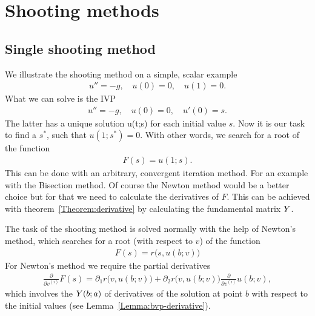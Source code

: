 \section{Shooting methods}
\subsection{Single shooting method}

\begin{example}
  We illustrate the shooting method on a simple, scalar example
  \begin{gather*}
    u'' = -g, \quad u(0) = 0, \quad u(1) = 0.
  \end{gather*}
	What we can solve is the IVP
  \begin{gather*}
    u'' = -g, \quad u(0) = 0, \quad u'(0) = s.
  \end{gather*}
	The latter has a unique solution u(t;s) for each initial value
  $s$. Now it is our task to find a $s^*$, such that
  $u(1;s^*) = 0$. With other words, we search for a root of the function
  \begin{gather*}  
    F(s) = u(1;s).
  \end{gather*}
  This can be done with an arbitrary, convergent iteration method.
  For an example with the Bisection method.  Of course the Newton
  method would be a better choice but for that we need to calculate
  the derivatives of $F$.  This can be achieved with
  theorem~\ref{Theorem:derivative} by calculating the
  fundamental matrix $Y$.
\end{example}



\begin{remark}
  The task of the shooting method is solved normally with the help of
  Newton's method, which searches for a root (with respect to $v$) of
  the function
  \begin{gather}
    \label{eq:rwa:11}
    F(s) = r\bigl(s, u(b;v)\bigr)
  \end{gather}
	For Newton's method we require the partial derivatives
  \begin{gather*}
    \frac\partial{\partial v^{(i)}} F(s) =
    \partial_1 r\bigr(v,u(b;v)\bigr)
    + \partial_2r\bigr(v,u(b;v)\bigr) \frac\partial{\partial v^{(i)}} u(b;v),
  \end{gather*}
  which involves the  $\fundamental(b;a)$
  of derivatives of the solution at point $b$ with respect to the
  initial values (see Lemma~\ref{Lemma:bvp-derivative}).
\end{remark}

